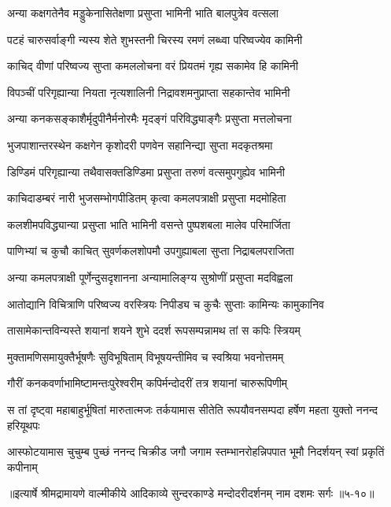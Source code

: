 \twolineshloka
{अन्या कक्षगतेनैव मड्डुकेनासितेक्षणा}
{प्रसुप्ता भामिनी भाति बालपुत्रेव वत्सला} %

\twolineshloka
{पटहं चारुसर्वाङ्गी न्यस्य शेते शुभस्तनी}
{चिरस्य रमणं लब्ध्वा परिष्वज्येव कामिनी} %

\twolineshloka
{काचिद् वीणां परिष्वज्य सुप्ता कमललोचना}
{वरं प्रियतमं गृह्य सकामेव हि कामिनी} %

\twolineshloka
{विपञ्चीं परिगृह्यान्या नियता नृत्यशालिनी}
{निद्रावशमनुप्राप्ता सहकान्तेव भामिनी} %

\twolineshloka
{अन्या कनकसङ्काशैर्मृदुपीनैर्मनोरमैः}
{मृदङ्गं परिविद्ध्याङ्गैः प्रसुप्ता मत्तलोचना} %

\twolineshloka
{भुजपाशान्तरस्थेन कक्षगेन कृशोदरी}
{पणवेन सहानिन्द्या सुप्ता मदकृतश्रमा} %

\twolineshloka
{डिण्डिमं परिगृह्यान्या तथैवासक्तडिण्डिमा}
{प्रसुप्ता तरुणं वत्समुपगुह्येव भामिनी} %

\twolineshloka
{काचिदाडम्बरं नारी भुजसम्भोगपीडितम्}
{कृत्वा कमलपत्राक्षी प्रसुप्ता मदमोहिता} %

\twolineshloka
{कलशीमपविद्ध्यान्या प्रसुप्ता भाति भामिनी}
{वसन्ते पुष्पशबला मालेव परिमार्जिता} %

\twolineshloka
{पाणिभ्यां च कुचौ काचित् सुवर्णकलशोपमौ}
{उपगुह्याबला सुप्ता निद्राबलपराजिता} %

\twolineshloka
{अन्या कमलपत्राक्षी पूर्णेन्दुसदृशानना}
{अन्यामालिङ्ग्य सुश्रोणीं प्रसुप्ता मदविह्वला} %

\twolineshloka
{आतोद्यानि विचित्राणि परिष्वज्य वरस्त्रियः}
{निपीड्य च कुचैः सुप्ताः कामिन्यः कामुकानिव} %

\twolineshloka
{तासामेकान्तविन्यस्ते शयानां शयने शुभे}
{ददर्श रूपसम्पन्नामथ तां स कपिः स्त्रियम्} %

\twolineshloka
{मुक्तामणिसमायुक्तैर्भूषणैः सुविभूषिताम्}
{विभूषयन्तीमिव च स्वश्रिया भवनोत्तमम्} %

\twolineshloka
{गौरीं कनकवर्णाभामिष्टामन्तःपुरेश्वरीम्}
{कपिर्मन्दोदरीं तत्र शयानां चारुरूपिणीम्} %

\threelineshloka
{स तां दृष्ट्वा महाबाहुर्भूषितां मारुतात्मजः}
{तर्कयामास सीतेति रूपयौवनसम्पदा}
{हर्षेण महता युक्तो ननन्द हरियूथपः} %

\twolineshloka
{आस्फोटयामास चुचुम्ब पुच्छं ननन्द चिक्रीड जगौ जगाम}
{स्तम्भानरोहन्निपपात भूमौ निदर्शयन् स्वां प्रकृतिं कपीनाम्} %


॥इत्यार्षे श्रीमद्रामायणे वाल्मीकीये आदिकाव्ये सुन्दरकाण्डे मन्दोदरीदर्शनम् नाम दशमः सर्गः ॥५-१०॥
